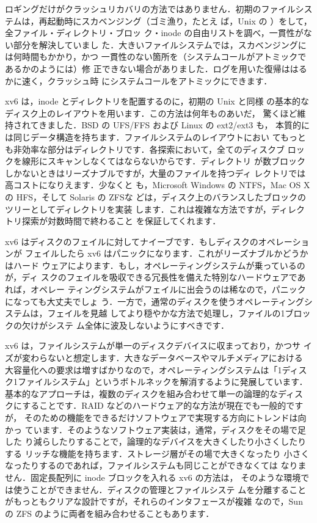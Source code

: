 ロギングだけがクラッシュリカバリの方法ではありません．初期のファイルシス
テムは，再起動時にスカベンジング（ゴミ漁り，たとえ
ば，Unix の ）をして，全ファイル・ディレクトリ・ブロッ
ク・inode の自由リストを調べ，一貫性がない部分を解決していまし
た．大きいファイルシステムでは，スカベンジングには何時間もかかり，かつ
一貫性のない箇所を（システムコールがアトミックであるかのようには）修
正できない場合がありました．ログを用いた復帰ははるかに速く，クラッシュ時
にシステムコールをアトミックにできます．

xv6 は，inode とディレクトリを配置するのに，初期の Unix と同様
の基本的なディスク上のレイアウトを用います．この方法は何年ものあいだ，
驚くほど維持されてきました．BSD の UFS/FFS および Linux の ext2/ext3 も，
本質的には同じデータ構造を持ちます．ファイルシステムのレイアウトにおい
てもっとも非効率な部分はディレクトリです．各探索において，全てのディスクブ
ロックを線形にスキャンしなくてはならないからです．ディレクトリ
が数ブロックしかないときはリーズナブルですが，大量のファイルを持つディ
レクトリでは高コストになりえます．少なくと
も，Microsoft Windows の NTFS，Mac OS X の HFS，そして Solaris の ZFSな
どは，ディスク上のバランスしたブロックのツリーとしてディレクトリを実装
します．これは複雑な方法ですが，ディレクトリ探索が対数時間で終わること
を保証してくれます．

xv6 はディスクのフェイルに対してナイーブです．もしディスクのオペレーションが
フェイルしたら xv6 はパニックになります．これがリーズナブルかどうかはハード
ウェアによります．もし，オペレーティングシステムが乗っているのが，ディ
スクのフェイルを吸収できる冗長性を備えた特別なハードウェアであれば，オペレー
ティングシステムがフェイルに出会うのは稀なので，パニックになっても大丈夫でしょ
う．一方で，通常のディスクを使うオペレーティングシステムは，フェイルを見越
してより穏やかな方法で処理し，ファイルの1ブロックの欠けがシステ
ム全体に波及しないようにすべきです．

xv6 は，ファイルシステムが単一のディスクデバイスに収まっており，かつサ
イズが変わらないと想定します．大きなデータベースやマルチメディアにおける
大容量化への要求は増すばかりなので，オペレーティングシステムは「1ディス
ク1ファイルシステム」というボトルネックを解消するように発展しています．
基本的なアプローチは，複数のディスクを組み合わせて単一の論理的なディス
クにすることです．RAID などのハードウェア的な方法が現在でも一般的ですが，
そのための機能をできるだけソフトウェアで実現する方向にトレンドは向かっ
ています．そのようなソフトウェア実装は，通常，ディスクをその場で足した
り減らしたりすることで，論理的なデバイスを大きくしたり小さくしたりする
リッチな機能を持ちます．ストレージ層がその場で大きくなったり
小さくなったりするのであれば，ファイルシステムも同じことができなくては
なりません．固定長配列に inode ブロックを入れる xv6 の方法は，
そのような環境では使うことができません．ディスクの管理とファイルシステ
ムを分離することがもっともクリアな設計ですが，それらのインタフェースが複雑
なので，Sun の ZFS のように両者を組み合わせることもあります．

